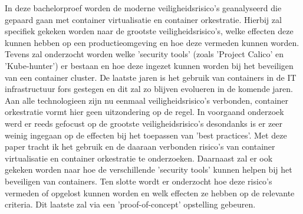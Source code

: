 In deze bachelorproef worden de moderne veiligheidsrisico’s geanalyseerd die gepaard gaan met container virtualisatie en container orkestratie. Hierbij zal specifiek gekeken worden naar de grootste veiligheidsrisico’s, welke effecten deze kunnen hebben op een productieomgeving en hoe deze vermeden kunnen worden. Tevens zal onderzocht worden welke ’security tools’ (zoals ’Project Calico’ en ’Kube-hunter’) er bestaan en hoe deze ingezet kunnen worden bij het beveiligen van een container cluster. De laatste jaren is het gebruik van containers in de IT infrastructuur fors gestegen en dit zal zo blijven evolueren in de komende jaren. Aan alle technologieen zijn nu eenmaal veiligheidsrisico’s verbonden, container orkestratie vormt hier geen uitzondering op de regel. In voorgaand onderzoek werd er reeds gefocust op de grootste veiligheidsrisico’s desondanks is er zeer weinig ingegaan op de effecten bij het toepassen van ’best practices’. Met deze paper tracht ik het gebruik en de daaraan verbonden risico’s van container virtualisatie en container orkestratie te onderzoeken. Daarnaast zal er ook gekeken worden naar hoe de verschillende ’security tools’ kunnen helpen bij het beveiligen van containers. Ten slotte wordt er onderzocht hoe deze risico’s vermeden of opgelost kunnen worden en welk effecten ze hebben op de relevante criteria. Dit laatste zal via een ’proof-of-concept’ opstelling gebeuren.
